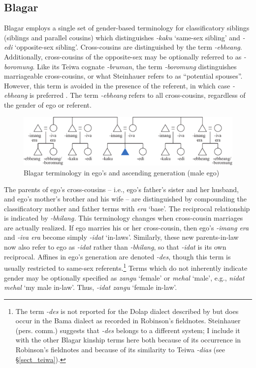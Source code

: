 \clearpage
\subsection{Blagar}\label{sect_blagar}
Blagar employs a single set of gender-based terminology for classificatory siblings (siblings and parallel cousins) which distinguishes \textit{-kaku} `same-sex sibling' and \textit{-edi} `opposite-sex sibling'. Cross-cousins are distinguished by the term \textit{-ebheang}. Additionally, cross-cousins of the opposite-sex may be optionally referred to as \textit{-boromung}. Like its Teiwa cognate \textit{-bruman}, the term \textit{-boromung} distinguishes marriageable cross-cousins, or what Steinhauer refers to as ``potential spouses''. However, this term is avoided in the presence of the referent, in which case \textit{-ebheang} is preferred \citep[156]{Steinhauer1993}. The term \textit{-ebheang} refers to all cross-cousins, regardless of the gender of ego or referent.


\begin{figure}[h]
\includegraphics[width=\textwidth]{figures/Holton_ch5_fig7.pdf}
\caption{Blagar terminology in ego's and ascending generation (male ego) }
\label{fig:5:7}
\end{figure}  
 

 

The parents of ego's cross-cousins -- i.e., ego's father's sister and her husband, and ego's mother's brother and his wife -- are distinguished by compounding the classificatory mother and father terms with \textit{era} `base'. The reciprocal relationship is indicated by \textit{-bhilang.} This terminology changes when cross-cousin marriages are actually realized. If ego marries his or her cross-cousin, then ego's \textit{-imang era} and \textit{-iva era} become simply \textit{-idat} `in-laws'. Similarly, these new parents-in-law now also refer to ego as \textit{-idat} rather than \textit{-bhilang}, so that \textit{-idat} is its own reciprocal. Affines in ego's generation are denoted \textit{-des}, though this term is usually restricted to same-sex referents.\footnote{The term \textit{-des} is not reported for the Dolap dialect described by \citet{Steinhauer1993} but does occur in the Bama dialect as recorded in Robinson's fieldnotes. Steinhauer (pers. comm.) suggests that \textit{-des} belongs to a different system; I include it with the other Blagar kinship terms here both because of its occurrence in Robinson's fieldnotes and because of its similarity to Teiwa \textit{-dias} (see {\S}\ref{sect_teiwa}).} Terms which do not inherently indicate gender may be optionally specified as \textit{zangu} `female' or \textit{mehal} `male', e.g., \textit{nidat mehal} `my male in-law'. Thus, \textit{-idat zangu} `female in-law'.


